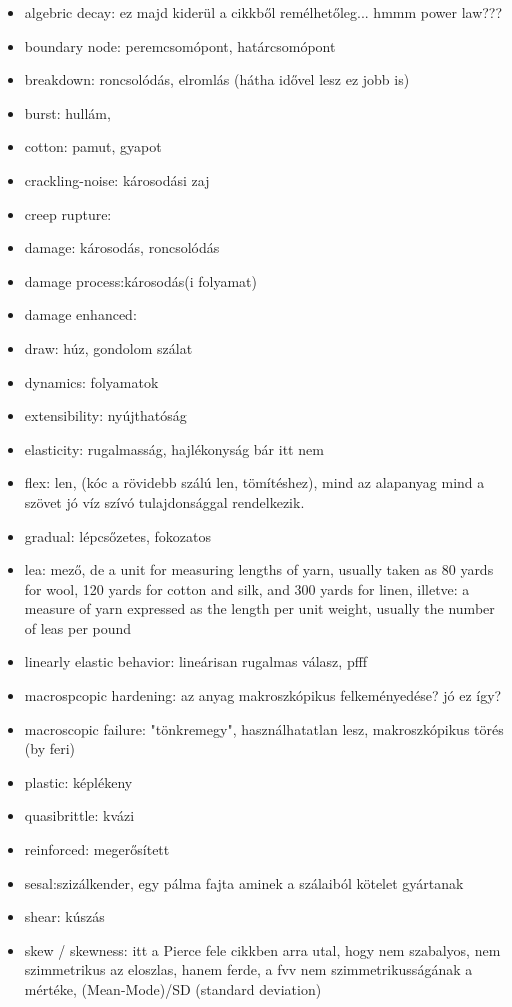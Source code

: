 \begin{itemize}
\item algebric decay: ez majd kiderül a cikkből remélhetőleg...	hmmm power law???
\item boundary node: peremcsomópont, határcsomópont
\item breakdown: roncsolódás, elromlás (hátha idővel lesz ez jobb is)
\item burst: hullám,
\item cotton: pamut, gyapot
\item crackling-noise: károsodási zaj
\item creep rupture: 
\item damage: károsodás, roncsolódás
\item damage process:károsodás(i folyamat)
\item damage enhanced:
\item draw: húz, gondolom szálat
\item dynamics: folyamatok
\item extensibility: nyújthatóság
\item elasticity: rugalmasság, hajlékonyság bár itt nem
\item flex: len, (kóc a rövidebb szálú len, tömítéshez), mind az alapanyag mind a szövet jó víz szívó tulajdonsággal rendelkezik.
\item gradual: lépcsőzetes, fokozatos
\item lea: mező, de a unit for measuring lengths of yarn, usually taken as 80 yards for wool, 120 yards for cotton and silk, and 300 yards for linen, illetve: a measure of yarn expressed as the length per unit weight, usually the number of leas per pound
\item linearly elastic behavior: lineárisan rugalmas válasz, pfff
\item macrospcopic hardening: az anyag makroszkópikus felkeményedése? jó ez így?
\item macroscopic failure: "tönkremegy", használhatatlan lesz, makroszkópikus törés (by feri)
\item plastic: képlékeny 
\item quasibrittle: kvázi
\item reinforced: megerősített
\item sesal:szizálkender, egy pálma fajta aminek a szálaiból kötelet gyártanak
\item shear: kúszás
\item skew / skewness: itt a Pierce fele cikkben arra utal, hogy nem szabalyos, nem szimmetrikus az eloszlas, hanem ferde, a fvv nem szimmetrikusságának a mértéke, (Mean-Mode)/SD (standard deviation)

\end{itemize}
